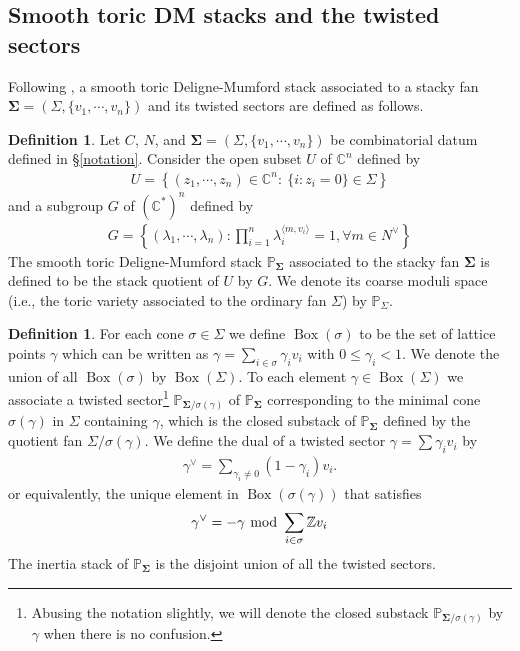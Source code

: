 \documentclass[11pt,reqno]{amsart}
\def\CC {{\mathbb C}}
\def\Z {{\mathbb Z}}
\def\PP {{\mathbb P}}
\theoremstyle{definition}
\newtheorem{definition}[theorem]{Definition}
\numberwithin{equation}{section}
\begin{document}
\subsection{Smooth toric DM stacks and the twisted sectors}

Following \cite{BCS}, a smooth toric Deligne-Mumford stack associated to a stacky fan $\mathbf{\Sigma}=(\Sigma,\{v_1,\cdots,v_n\})$ and its twisted sectors are defined as follows.

\smallskip

\begin{definition}
		Let $C$, $N$, and $\mathbf{\Sigma}=(\Sigma,\{v_1,\cdots,v_n\})$ be combinatorial datum defined in \S\ref{notation}. Consider the open subset $U$ of $\CC^n$ defined by
		\begin{align*}
			U=\left\{(z_1,\cdots,z_n)\in\CC^n:\ \{i:z_i=0\}\in\Sigma\right\}
		\end{align*}
		and a subgroup $G$ of $(\CC^*)^n$ defined by
		\begin{align*}
			G=\left\{(\lambda_1,\cdots,\lambda_n):\prod_{i=1}^n \lambda_i^{\langle m, v_i \rangle}=1,\forall m\in N^{\vee}\right\}
		\end{align*}
		The smooth toric Deligne-Mumford stack $\PP_{\mathbf{\Sigma}}$ associated to the stacky fan $\mathbf{\Sigma}$ is defined to be the stack quotient of $U$ by $G$. We denote its coarse moduli space (i.e., the toric variety associated to the ordinary fan $\Sigma$) by $\PP_{\Sigma}$.
\end{definition}

\smallskip

\begin{definition}
	For each cone $\sigma\in\Sigma$ we define $\operatorname{Box}(\sigma)$ to be the set of lattice points $\gamma$ which can be written as $\gamma=\sum_{i\in\sigma}\gamma_i v_i$ with $0\leq\gamma_i<1$. We denote the union of all $\operatorname{Box}(\sigma)$ by $\operatorname{Box}(\Sigma)$. To each element $\gamma\in\operatorname{Box}(\Sigma)$ we associate a twisted sector\footnote{Abusing the notation slightly, we will denote the closed substack $\PP_{\mathbf{\Sigma}/\sigma(\gamma)}$ by $\gamma$ when there is no confusion.} $\PP_{\mathbf{\Sigma}/\sigma(\gamma)}$ of $\PP_{\mathbf{\Sigma}}$ corresponding to the minimal cone $\sigma(\gamma)$ in $\Sigma$ containing $\gamma$, which is the closed substack of $\PP_{\mathbf{\Sigma}}$ defined by the quotient fan $\Sigma/\sigma(\gamma)$. We define the dual of a twisted sector $\gamma=\sum\gamma_i v_i$ by
\begin{align*}
	\gamma^{\vee}=\sum_{\gamma_i\not=0}(1-\gamma_i)v_i.
\end{align*}
or equivalently, the unique element in $\operatorname{Box}(\sigma(\gamma))$ that satisfies
\begin{align*}
	\gamma^{\vee}=-\gamma\hskip -3pt \mod \sum_{i\in\sigma}\Z v_i
\end{align*}
The inertia stack of $\PP_{\mathbf{\Sigma}}$ is the disjoint union of all the twisted sectors.
\end{definition}
\end{document}
